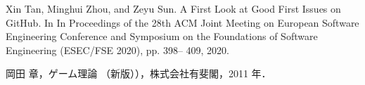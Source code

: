 \documentclass[11pt]{jreport}
\begin{document}
\begin{thebibliography}{99}
Xin Tan, Minghui Zhou, and Zeyu Sun. A First Look at Good First Issues on GitHub. In In
Proceedings of the 28th ACM Joint Meeting on European Software Engineering Conference
and Symposium on the Foundations of Software Engineering (ESEC/FSE 2020), pp. 398–
409, 2020.

岡田 章，ゲーム理論 （新版）），株式会社有斐閣，2011 年． 

\bibitem{}

\end{thebibliography}


% 
% 
% 

\end{document}
